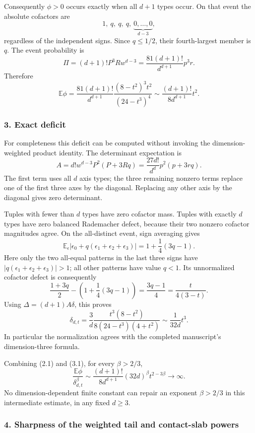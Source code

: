 \documentclass[
  11pt,
]{article}
\begin{document}
Consequently \(\phi>0\) occurs exactly when all \(d+1\) types occur. On
that event the absolute cofactors are \[
 1,\ q,\ q,\ q,\ \underbrace{0,\ldots,0}_{d-3},
\] regardless of the independent signs. Since \(q\le1/2\), their
fourth-largest member is \(q\). The event probability is \[
 \Pi=(d+1)!P^3Rw^{d-3}
      =\frac{81(d+1)!}{d^{d+1}}p^3r.
\] Therefore \[
 \boxed{\mathbb E\phi
  =\frac{81(d+1)!}{d^{d+1}}
    \frac{(8-t^2)^3t^2}{(24-t^3)^4}
  \sim\frac{(d+1)!}{8d^{d+1}}t^2.}                  \tag{2.1}
\]

\subsubsection{3. Exact deficit}\label{exact-deficit}

For completeness this deficit can be computed without invoking the
dimension-weighted product identity. The determinant expectation is \[
 A=d!w^{d-3}P^2(P+3Rq)
   =\frac{27d!}{d^d}p^2(p+3rq).
\] The first term uses all \(d\) axis types; the three remaining nonzero
terms replace one of the first three axes by the diagonal. Replacing any
other axis by the diagonal gives zero determinant.

Tuples with fewer than \(d\) types have zero cofactor mass. Tuples with
exactly \(d\) types have zero balanced Rademacher defect, because their
two nonzero cofactor magnitudes agree. On the all-distinct event, sign
averaging gives \[
 \mathbb E_\epsilon|\epsilon_0+q(\epsilon_1+\epsilon_2+\epsilon_3)|
   =1+\frac14(3q-1).
\] Here only the two all-equal patterns in the last three signs have
\(|q(\epsilon_1+\epsilon_2+\epsilon_3)|>1\); all other patterns have
value \(q<1\). Its unnormalized cofactor defect is consequently \[
 \frac{1+3q}{2}-\left(1+\frac14(3q-1)\right)
   =\frac{3q-1}{4}=\frac{t}{4(3-t)}.
\] Using \(\Delta=(d+1)A\delta\), this proves \[
 \boxed{\delta_{d,t}
    =\frac3d\frac{t^3(8-t^2)}{8(24-t^3)(4+t^2)}
    \sim\frac1{32d}t^3.}                                  \tag{3.1}
\] In particular the normalization agrees with the completed
manuscript's dimension-three formula.

Combining (2.1) and (3.1), for every \(\beta>2/3\), \[
 \frac{\mathbb E\phi}{\delta_{d,t}^{\beta}}
 \sim\frac{(d+1)!}{8d^{d+1}}(32d)^\beta t^{2-3\beta}
 \longrightarrow\infty.
\] No dimension-dependent finite constant can repair an exponent
\(\beta>2/3\) in this intermediate estimate, in any fixed \(d\ge3\).

\subsubsection{4. Sharpness of the weighted tail and contact-slab
powers}\label{sharpness-of-the-weighted-tail-and-contact-slab-powers}
\end{document}
